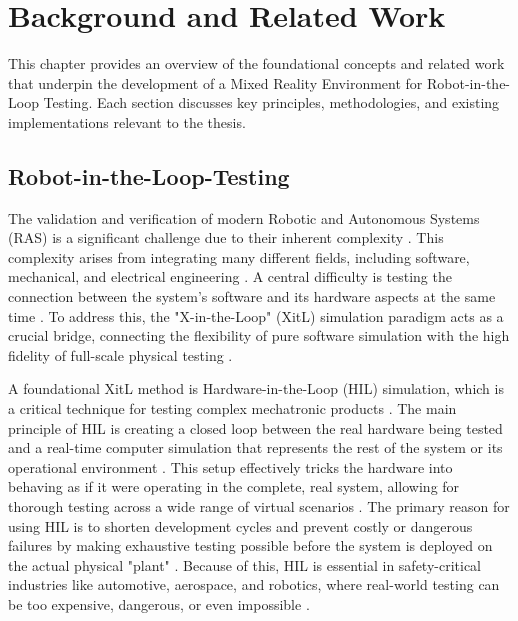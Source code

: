 \chapter{Background and Related Work}
\label{chap:background}

This chapter provides an overview of the foundational concepts and related work that underpin the development of a Mixed Reality Environment for Robot-in-the-Loop Testing. Each section discusses key principles, methodologies, and existing implementations relevant to the thesis.
\section{Robot-in-the-Loop-Testing}
\label{sec:RitL}
The validation and verification of modern Robotic and Autonomous Systems (RAS) is a significant challenge due to their inherent complexity \cite{AMV23}. This complexity arises from integrating many different fields, including software, mechanical, and electrical engineering \cite{AMV23}. A central difficulty is testing the connection between the system's software and its hardware aspects at the same time \cite{AMV23}. To address this, the "X-in-the-Loop" (XitL) simulation paradigm acts as a crucial bridge, connecting the flexibility of pure software simulation with the high fidelity of full-scale physical testing \cite{Brayanov2019}.

A foundational XitL method is Hardware-in-the-Loop (HIL) simulation, which is a critical technique for testing complex mechatronic products \cite{Mihalic2022, Brayanov2019}. The main principle of HIL is creating a closed loop between the real hardware being tested and a real-time computer simulation that represents the rest of the system or its operational environment \cite{Mihalic2022}. This setup effectively tricks the hardware into behaving as if it were operating in the complete, real system, allowing for thorough testing across a wide range of virtual scenarios \cite{Brayanov2019}. The primary reason for using HIL is to shorten development cycles and prevent costly or dangerous failures by making exhaustive testing possible before the system is deployed on the actual physical "plant" \cite{Mihalic2022}. Because of this, HIL is essential in safety-critical industries like automotive, aerospace, and robotics, where real-world testing can be too expensive, dangerous, or even impossible \cite{Brayanov2019}.

